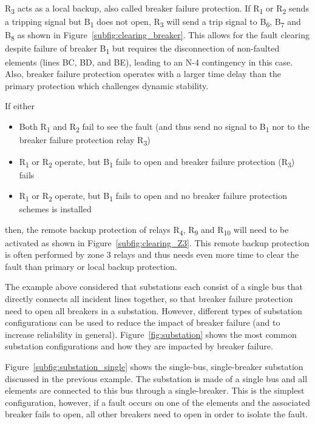 R\textsubscript{3} acts as a local backup, also called breaker failure protection. If R\textsubscript{1} or R\textsubscript{2} sends a tripping signal but B\textsubscript{1} does not open, R\textsubscript{3} will send a trip signal to B\textsubscript{6}, B\textsubscript{7} and B\textsubscript{8} as shown in Figure~\ref{subfig:clearing_breaker}. This allows for the fault clearing despite failure of breaker B\textsubscript{1} but requires the disconnection of non-faulted elements (lines BC, BD, and BE), leading to an N-4 contingency in this case. Also, breaker failure protection operates with a larger time delay than the primary protection which challenges dynamic stability.

If either

\begin{itemize}
    \item Both R\textsubscript{1} and R\textsubscript{2} fail to see the fault (and thus send no signal to B\textsubscript{1} nor to the breaker failure protection relay R\textsubscript{3})
    \item R\textsubscript{1} or R\textsubscript{2} operate, but B\textsubscript{1} fails to open and breaker failure protection (R\textsubscript{3}) fails
    \item R\textsubscript{1} or R\textsubscript{2} operate, but B\textsubscript{1} fails to open and no breaker failure protection schemes is installed
\end{itemize}
\noindent then, the remote backup protection of relays R\textsubscript{4}, R\textsubscript{9} and R\textsubscript{10} will need to be activated as shown in Figure~\ref{subfig:clearing_Z3}. This remote backup protection is often performed by zone 3 relays and thus needs even more time to clear the fault than primary or local backup protection.

The example above considered that substations each consist of a single bus that directly connects all incident lines together, so that breaker failure protection need to open all breakers in a substation. However, different types of substation configurations can be used to reduce the impact of breaker failure (and to increase reliability in general). Figure~\ref{fig:substation} shows the most common substation configurations and how they are impacted by breaker failure.

Figure~\ref{subfig:substation_single} shows the single-bus, single-breaker substation discussed in the previous example. The substation is made of a single bus and all elements are connected to this bus through a single-breaker. This is the simplest configuration, however, if a fault occurs on one of the elements and the associated breaker fails to open, all other breakers need to open in order to isolate the fault.

